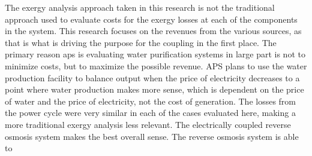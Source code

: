 The exergy analysis approach taken in this research is not the traditional approach used to evaluate costs for the exergy losses at each of the components in the system.  This research focuses on the revenues from the various sources, as that is what is driving the purpose for the coupling in the first place.  The primary reason \ac{aps} is evaluating water purification systems in large part is not to minimize costs, but to maximize the possible revenue.  APS plans to use the water production facility to balance output when the price of electricity decreases to a point where water production makes more sense, which is dependent on the price of water and the price of electricity, not the cost of generation. The losses from the power cycle were very similar in each of the cases evaluated here, making a more traditional exergy analysis less relevant. The electrically coupled reverse osmosis system makes the best overall sense.  The reverse osmosis system is able to

